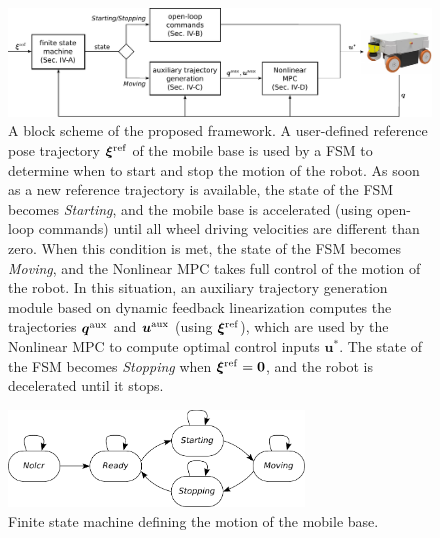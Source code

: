 \begin{figure}
    \centering
    \includegraphics[width=\textwidth]{figures/SWMR/blockscheme.pdf}
    \caption{A block scheme of the proposed framework. A user-defined reference pose trajectory $\bm{\xi}^{\rm ref}$ of the mobile base is used by a FSM to determine when to start and stop the motion of the robot. As soon as a new reference trajectory is available, the state of the FSM becomes \textit{Starting}, and the mobile base is accelerated (using open-loop commands) until all wheel driving velocities are different than zero. When this condition is met, the state of the FSM becomes \textit{Moving}, and the Nonlinear MPC takes full control of the motion of the robot. In this situation, an auxiliary trajectory generation module based on dynamic feedback linearization computes the trajectories $\bm{q}^{\rm aux}$ and $\bm{u}^{\rm aux}$ (using $\bm{\xi}^{\rm ref}$), which are used by the Nonlinear MPC to compute optimal control inputs $\bm{u}^*$. The state of the FSM becomes \textit{Stopping} when $\bm{\xi}^{\rm ref} = \bm{0}$, and the robot is decelerated until it stops.}
    \label{fig:block-scheme}
\end{figure}

\begin{figure}
    \centering
    \includegraphics[width=0.7\textwidth]{figures/SWMR/finitestatemachine.pdf}
    \caption{Finite state machine defining the motion of the mobile base.}
    \label{fig:finite-state-machine}
\end{figure}


